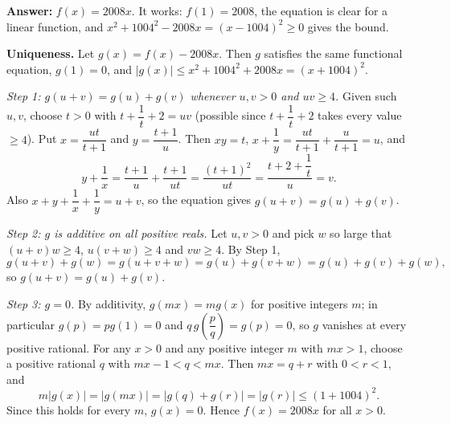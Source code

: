 \textbf{Answer:} $\boxed{f(x)=2008x}$. It works: $f(1)=2008$, the equation is clear for a linear function, and $x^2+1004^2-2008x=(x-1004)^2\ge0$ gives the bound.

\textbf{Uniqueness.} Let $g(x)=f(x)-2008x$. Then $g$ satisfies the same functional equation, $g(1)=0$, and $|g(x)|\le x^2+1004^2+2008x=(x+1004)^2$.

\emph{Step 1: $g(u+v)=g(u)+g(v)$ whenever $u,v>0$ and $uv\ge4$.} Given such $u,v$, choose $t>0$ with $t+\dfrac{1}{t}+2=uv$ (possible since $t+\dfrac{1}{t}+2$ takes every value $\ge4$). Put $x=\dfrac{ut}{t+1}$ and $y=\dfrac{t+1}{u}$. Then $xy=t$, $x+\dfrac{1}{y}=\dfrac{ut}{t+1}+\dfrac{u}{t+1}=u$, and
\[y+\dfrac{1}{x}=\dfrac{t+1}{u}+\dfrac{t+1}{ut}=\dfrac{(t+1)^2}{ut}=\dfrac{t+2+\dfrac{1}{t}}{u}=v .\]
Also $x+y+\dfrac{1}{x}+\dfrac{1}{y}=u+v$, so the equation gives $g(u+v)=g(u)+g(v)$.

\emph{Step 2: $g$ is additive on all positive reals.} Let $u,v>0$ and pick $w$ so large that $(u+v)w\ge4$, $u(v+w)\ge4$ and $vw\ge4$. By Step 1,
\[g(u+v)+g(w)=g(u+v+w)=g(u)+g(v+w)=g(u)+g(v)+g(w),\]
so $g(u+v)=g(u)+g(v)$.

\emph{Step 3: $g=0$.} By additivity, $g(mx)=mg(x)$ for positive integers $m$; in particular $g(p)=pg(1)=0$ and $q\,g\left(\dfrac {p}{q}\right)=g(p)=0$, so $g$ vanishes at every positive rational. For any $x>0$ and any positive integer $m$ with $mx>1$, choose a positive rational $q$ with $mx-1<q<mx$. Then $mx=q+r$ with $0<r<1$, and
\[m|g(x)|=|g(mx)|=|g(q)+g(r)|=|g(r)|\le(1+1004)^2 .\]
Since this holds for every $m$, $g(x)=0$. Hence $f(x)=2008x$ for all $x>0$.
